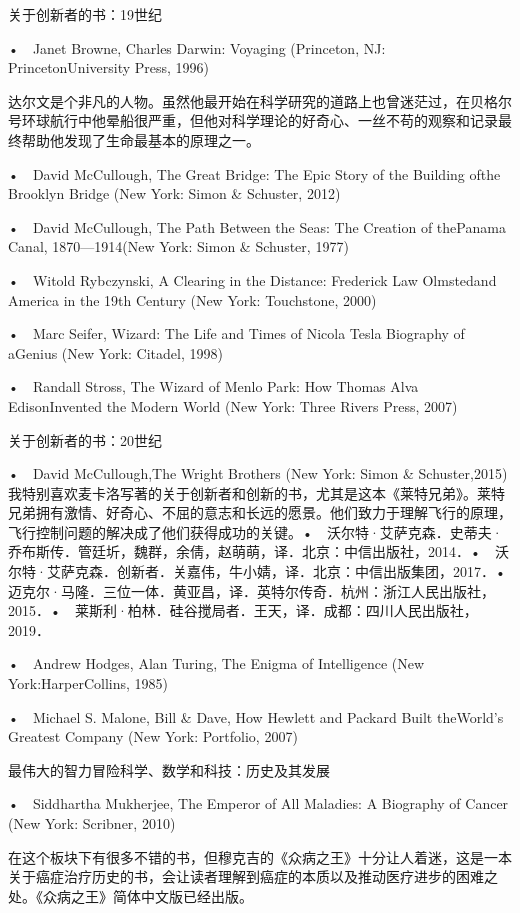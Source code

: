 关于创新者的书：19世纪

•　Janet Browne, Charles Darwin: Voyaging (Princeton, NJ: PrincetonUniversity Press, 1996)

达尔文是个非凡的人物。虽然他最开始在科学研究的道路上也曾迷茫过，在贝格尔号环球航行中他晕船很严重，但他对科学理论的好奇心、一丝不苟的观察和记录最终帮助他发现了生命最基本的原理之一。

•　David McCullough, The Great Bridge: The Epic Story of the Building ofthe Brooklyn Bridge (New York: Simon \& Schuster, 2012)

•　David McCullough, The Path Between the Seas: The Creation of thePanama Canal, 1870—1914(New York: Simon \& Schuster, 1977)

•　Witold Rybczynski, A Clearing in the Distance: Frederick Law Olmstedand America in the 19th Century (New York: Touchstone, 2000)

•　Marc Seifer, Wizard: The Life and Times of Nicola Tesla Biography of aGenius (New York: Citadel, 1998)

•　Randall Stross, The Wizard of Menlo Park: How Thomas Alva EdisonInvented the Modern World (New York: Three Rivers Press, 2007)



关于创新者的书：20世纪

•　David McCullough,The Wright Brothers (New York: Simon \& Schuster,2015)我特别喜欢麦卡洛写著的关于创新者和创新的书，尤其是这本《莱特兄弟》。莱特兄弟拥有激情、好奇心、不屈的意志和长远的愿景。他们致力于理解飞行的原理，飞行控制问题的解决成了他们获得成功的关键。•　沃尔特·艾萨克森．史蒂夫·乔布斯传．管廷圻，魏群，余倩，赵萌萌，译．北京：中信出版社，2014．•　沃尔特·艾萨克森．创新者．关嘉伟，牛小婧，译．北京：中信出版集团，2017．•　迈克尔·马隆．三位一体．黄亚昌，译．英特尔传奇．杭州：浙江人民出版社，2015．•　莱斯利·柏林．硅谷搅局者．王天，译．成都：四川人民出版社，2019．

•　Andrew Hodges, Alan Turing, The Enigma of Intelligence (New York:HarperCollins, 1985)

•　Michael S. Malone, Bill \& Dave, How Hewlett and Packard Built theWorld’s Greatest Company (New York: Portfolio, 2007)



最伟大的智力冒险科学、数学和科技：历史及其发展

•　Siddhartha Mukherjee, The Emperor of All Maladies: A Biography of Cancer (New York: Scribner, 2010)

在这个板块下有很多不错的书，但穆克吉的《众病之王》十分让人着迷，这是一本关于癌症治疗历史的书，会让读者理解到癌症的本质以及推动医疗进步的困难之处。《众病之王》简体中文版已经出版。

